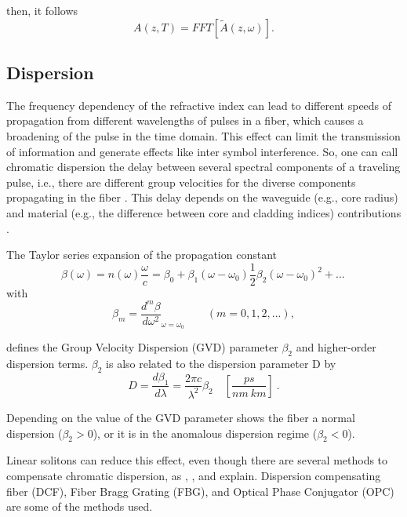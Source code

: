         then, it follows
        \begin{equation} \label{eq_deffft}
                A(z,T) = FFT \left[ \tilde{A}(z,\omega) \right].
            \end{equation}
            
            
        \subsection{Dispersion}
    The frequency dependency of the refractive index can lead to different speeds of propagation from different wavelengths of pulses in a fiber, which causes a broadening of the pulse in the time domain. This effect can limit the transmission of information and generate effects like inter symbol interference.  So, one can call chromatic dispersion the delay between several spectral components of a traveling pulse, i.e., there are different group velocities for the diverse components propagating in the fiber  \citep{Udayakumar2013ChromaticDC}. This delay depends on the waveguide (e.g., core radius) and material (e.g., the difference between core and cladding indices) contributions \citep{dudley_taylor_2010}. 
    
    The Taylor series expansion of the propagation constant 
    \begin{equation}
         \beta(\omega) = n (\omega)\frac{\omega}{c} = \beta_0 + \beta_1(\omega-\omega_0) \frac{1}{2}\beta_2(\omega-\omega_0)^2+...\, 
         \label{eq_betas}
    \end{equation}
    with 
    \begin{equation}
        \beta_m = \frac{d^m\beta}{d\omega^2}_{\omega = \omega_0} \qquad (m = 0,1,2,...),
        \label{eq_dbeta}
    \end{equation}
    
    
    defines the Group Velocity Dispersion (GVD) parameter $\beta_2$  and higher-order dispersion terms.  $\beta_2$ is also related to the dispersion parameter D by
    \begin{equation}
        D = \frac{d\beta_1}{d\lambda} = \frac{2\pi c}{\lambda^2}\beta_2 \quad [\frac{ps}{nm \ km}] \ .
        \label{eq_Ds}
    \end{equation}
    
    Depending on the value of the GVD parameter shows the fiber a normal dispersion ($\beta_2 > 0$), or it is in the anomalous dispersion regime ($\beta_2 < 0$).
    
    Linear solitons can reduce this effect, even though there are several methods to compensate chromatic dispersion, as \cite{AgrawalBook}, \cite{dudley_taylor_2010},  and \citep{Udayakumar2013ChromaticDC} explain. Dispersion compensating fiber (DCF), Fiber Bragg Grating (FBG), and Optical Phase Conjugator (OPC) are some of the methods used.
    
